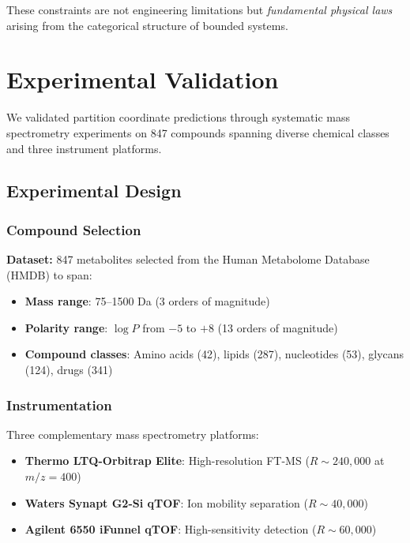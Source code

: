 \documentclass[twocolumn,10pt]{article}
\begin{document}
These constraints are not engineering limitations but \emph{fundamental physical laws} arising from the categorical structure of bounded systems.

\section{Experimental Validation}
\label{sec:validation}

We validated partition coordinate predictions through systematic mass spectrometry experiments on 847 compounds spanning diverse chemical classes and three instrument platforms.

\subsection{Experimental Design}

\subsubsection{Compound Selection}

\textbf{Dataset:} 847 metabolites selected from the Human Metabolome Database (HMDB) to span:
\begin{itemize}
    \item \textbf{Mass range}: 75–1500 Da (3 orders of magnitude)
    \item \textbf{Polarity range}: $\log P$ from $-5$ to $+8$ (13 orders of magnitude)
    \item \textbf{Compound classes}: Amino acids (42), lipids (287), nucleotides (53), glycans (124), drugs (341)
\end{itemize}

\subsubsection{Instrumentation}

Three complementary mass spectrometry platforms:
\begin{itemize}
    \item \textbf{Thermo LTQ-Orbitrap Elite}: High-resolution FT-MS ($R \sim 240{,}000$ at $m/z = 400$)
    \item \textbf{Waters Synapt G2-Si qTOF}: Ion mobility separation ($R \sim 40{,}000$)
    \item \textbf{Agilent 6550 iFunnel qTOF}: High-sensitivity detection ($R \sim 60{,}000$)
\end{itemize}
\end{document}
